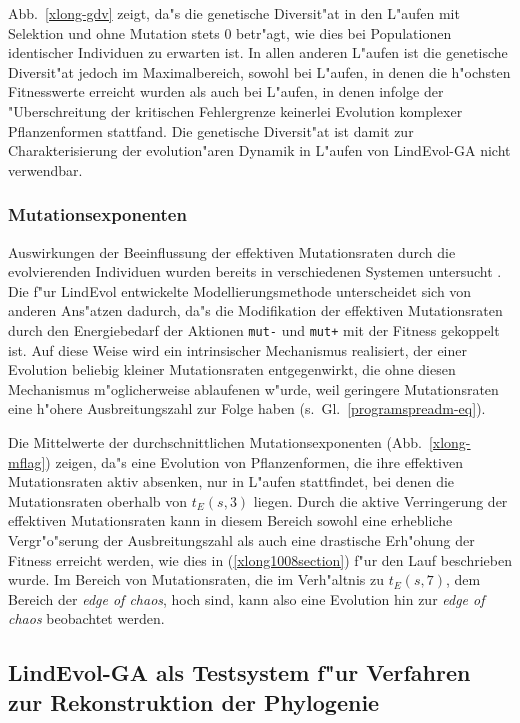 Abb.\ \ref{xlong-gdv} zeigt, da"s die genetische Diversit"at in den L"aufen mit Selektion und ohne Mutation
stets 0 betr"agt, wie dies bei Populationen identischer Individuen zu erwarten ist. In allen anderen L"aufen
ist die genetische Diversit"at jedoch im Maximalbereich, sowohl bei L"aufen, in denen die h"ochsten Fitnesswerte
erreicht wurden als auch bei L"aufen, in denen infolge der "Uberschreitung der kritischen Fehlergrenze keinerlei
Evolution komplexer Pflanzenformen stattfand. Die genetische Diversit"at ist damit zur Charakterisierung der
evolution"aren Dynamik in L"aufen von LindEvol-GA nicht verwendbar.



\subsubsection{Mutationsexponenten}

Auswirkungen der Beeinflussung der effektiven Mutationsraten durch die evolvierenden Individuen wurden bereits
in verschiedenen Systemen untersucht \cite{Maley94}. Die f"ur LindEvol entwickelte Modellierungsmethode unterscheidet
sich von anderen Ans"atzen dadurch, da"s die Modifikation der effektiven Mutationsraten durch den Energiebedarf
der Aktionen \verb|mut-| und \verb|mut+| mit der Fitness gekoppelt ist. Auf diese Weise wird ein intrinsischer
Mechanismus realisiert, der einer Evolution beliebig kleiner Mutationsraten entgegenwirkt, die ohne diesen
Mechanismus m"oglicherweise ablaufenen w"urde, weil geringere Mutationsraten eine h"ohere Ausbreitungszahl
zur Folge haben (s.\ Gl.\ \ref{programspreadm-eq}).

Die Mittelwerte der durchschnittlichen Mutationsexponenten (Abb.\ \ref{xlong-mflag}) zeigen, da"s eine Evolution
von Pflanzenformen, die ihre effektiven Mutationsraten aktiv absenken, nur in L"aufen stattfindet, bei denen
die Mutationsraten oberhalb von $t_E(s,3)$ liegen. Durch die aktive Verringerung der effektiven Mutationsraten
kann in diesem Bereich sowohl eine erhebliche Vergr"o"serung der Ausbreitungszahl als auch eine drastische
Erh"ohung der Fitness erreicht werden, wie dies in (\ref{xlong1008section}) f"ur den Lauf 
beschrieben wurde. Im Bereich von Mutationsraten, die im Verh"altnis zu $t_E(s,7)$, dem Bereich der \textsl{edge of chaos},
hoch sind, kann also eine Evolution hin zur \textsl{edge of chaos} \cite{Kauffman92} beobachtet werden.


\subsection{LindEvol-GA als Testsystem f"ur Verfahren zur Rekonstruktion der Phylogenie}
\label{lndga-phylogeny}

